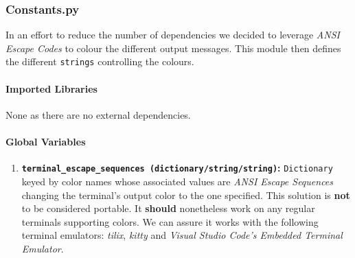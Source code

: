 \subsubsection{Constants.py}
    In an effort to reduce the number of dependencies we decided to leverage \textit{ANSI Escape Codes} to colour the different output messages. This module then defines the different \texttt{strings} controlling the colours.

    \paragraph{Imported Libraries}
        None as there are no external dependencies.

    \paragraph{Global Variables}
        \begin{enumerate}
            \item \textbf{\texttt{terminal\_escape\_sequences (dictionary/string/string)}:} \texttt{Dictionary} keyed by color names whose associated values are \textit{ANSI Escape Sequences} changing the terminal's output color to the one specified. This solution is \textbf{not} to be considered portable. It \textbf{should} nonetheless work on any regular terminals supporting colors. We can assure it works with the following terminal emulators: \textit{tilix}, \textit{kitty} and \textit{Visual Studio Code's Embedded Terminal Emulator}.
        \end{enumerate}